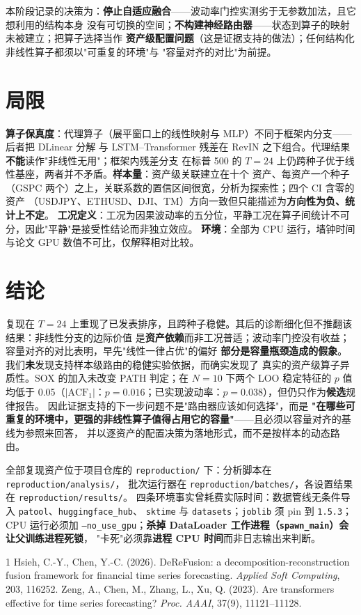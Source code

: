 \documentclass[conference]{IEEEtran}
\begin{document}
本阶段记录的决策为：\textbf{停止自适应融合}——波动率门控实测劣于无参数加法，且它想利用的结构本身
没有可切换的空间；\textbf{不构建神经路由器}——状态到算子的映射未被建立；把算子选择当作
\textbf{资产级配置问题}（这是证据支持的做法）；任何结构化非线性算子都须以"可重复的环境"与
"容量对齐的对比"为前提。

\section{局限}
\textbf{算子保真度}：代理算子（展平窗口上的线性映射与 MLP）不同于框架内分支——后者把 DLinear 分解
与 LSTM--Transformer 残差在 RevIN 之下组合。代理结果\textbf{不能}读作"非线性无用"；框架内残差分支
在标普 500 的 $T=24$ 上仍跨种子优于线性基座，两者并不矛盾。\textbf{样本量}：资产级关联建立在十个
资产、每资产一个种子（GSPC 两个）之上，关联系数的置信区间很宽，分析为探索性；四个 CI 含零的资产
（USDJPY、ETHUSD、DJI、TM）方向一致但只能描述为\textbf{方向性为负、统计上不定}。
\textbf{工况定义}：工况为因果波动率的五分位，平静工况在算子间统计不可分，因此"平静"是接受性结论而非独立效应。
\textbf{环境}：全部为 CPU 运行，墙钟时间与论文 GPU 数值不可比，仅解释相对比较。

\section{结论}
复现在 $T=24$ 上重现了已发表排序，且跨种子稳健。其后的诊断细化但不推翻该结果：非线性分支的边际价值
是\textbf{资产依赖}而非工况普适；波动率门控没有收益；容量对齐的对比表明，早先"线性一律占优"的偏好
\textbf{部分是容量瓶颈造成的假象}。我们\textbf{未}发现支持样本级路由的稳健实验依据，而确实发现了
真实的资产级算子异质性。SOX 的加入未改变 PATH 判定；在 $N=10$ 下两个 LOO 稳定特征的 $p$ 值均低于
0.05（$|\mathrm{ACF}_1|$：$p=0.016$；已实现波动率：$p=0.038$），但仍只作为\textbf{候选}规律报告。
因此证据支持的下一步问题不是"路由器应该如何选择"，而是
\textbf{"在哪些可重复的环境中，更强的非线性算子值得占用它的容量"}——且必须以容量对齐的基线为参照来回答，
并以逐资产的配置决策为落地形式，而不是按样本的动态路由。

\appendix[可复现性说明]
全部复现资产位于项目仓库的 \texttt{reproduction/} 下：分析脚本在 \texttt{reproduction/analysis/}，
批次运行器在 \texttt{reproduction/batches/}，各设置结果在 \texttt{reproduction/results/}。
四条环境事实曾耗费实际时间：数据管线无条件导入 \texttt{patool}、\texttt{huggingface\_hub}、
\texttt{sktime} 与 \texttt{datasets}；\texttt{joblib} 须 pin 到 \texttt{1.5.3}；CPU 运行必须加
\texttt{--no\_use\_gpu}；\textbf{杀掉 DataLoader 工作进程（\texttt{spawn\_main}）会让父训练进程死锁}，
"卡死"必须靠\textbf{进程 CPU 时间}而非日志输出来判断。

\begin{thebibliography}{1}
 Hsieh, C.-Y., Chen, Y.-C. (2026). DeReFusion: a decomposition-reconstruction
fusion framework for financial time series forecasting. \emph{Applied Soft Computing}, 203, 116252.
 Zeng, A., Chen, M., Zhang, L., Xu, Q. (2023). Are transformers effective for
time series forecasting? \emph{Proc. AAAI}, 37(9), 11121--11128.
\end{thebibliography}
\end{document}
